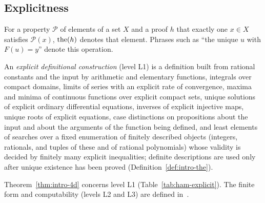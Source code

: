 \subsection{Explicitness}\label{sec:intro-explicitness}

\begin{definition}\label{def:intro-the}
For a property $\mathcal P$ of elements of a set $X$ and a proof $h$ that exactly one $x\in X$ satisfies
$\mathcal P(x)$, $\operatorname{the}(h)$ denotes that element. Phrases such as ``the unique $u$ with $F(u)=y$''
denote this operation.
\end{definition}

\begin{definition}\label{def:intro-levels}
An \emph{explicit definitional construction} (level L1) is a definition built from rational constants and the input by
arithmetic and elementary functions, integrals over compact domains, limits of series with an explicit rate of
convergence, maxima and minima of continuous functions over explicit compact sets, unique solutions of explicit
ordinary differential equations, inverses of explicit injective maps, unique roots of explicit equations, case
distinctions on propositions about the input and about the arguments of the function being defined, and least
elements of searches over a fixed enumeration of finitely described objects (integers, rationals, and tuples of these
and of rational polynomials) whose validity is decided by finitely many explicit inequalities; definite descriptions
are used only after unique existence has been proved (Definition~\ref{def:intro-the}).
\end{definition}

Theorem~\ref{thm:intro-4d} concerns level L1 (Table~\ref{tab:ham-explicit}). The finite form and computability
(levels L2 and L3) are defined in~\cite{SongHD}.
